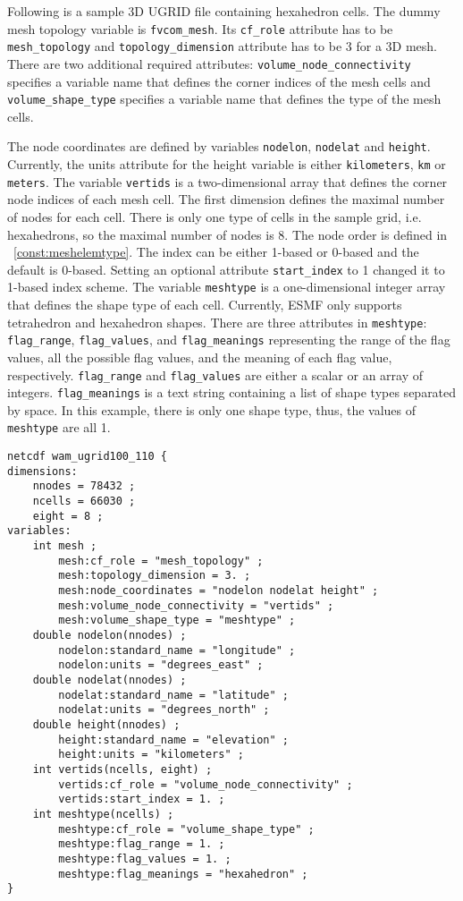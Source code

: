 Following is a sample 3D UGRID file containing hexahedron cells. The dummy mesh topology variable is {\tt fvcom\_mesh}. Its {\tt cf\_role} attribute has to be {\tt mesh\_topology}
and {\tt topology\_dimension} attribute has to be 3 for a 3D mesh.  There are two additional required attributes:
{\tt volume\_node\_connectivity} specifies a variable name that defines the corner indices of the mesh cells and
{\tt volume\_shape\_type} specifies a variable name that defines the type of the mesh cells.

The node coordinates are defined by variables {\tt nodelon}, {\tt nodelat} and {\tt height}. Currently, the units
attribute for the height variable is either {\tt kilometers}, {\tt km} or {\tt meters}.
The variable {\tt vertids} is a two-dimensional array that defines the corner node indices of each mesh cell. The first dimension
defines the maximal number of nodes for each cell. There is only one type of cells in the sample grid, i.e. hexahedrons, so the maximal number
of nodes is 8.  The node order is defined in ~\ref{const:meshelemtype}.  The index can be either 1-based or 0-based and
the default is 0-based.
 Setting an optional attribute {\tt start\_index} to 1 changed it to 1-based index scheme.
The variable {\tt meshtype} is a one-dimensional integer array that defines the shape type of each cell.  Currently, ESMF only
supports tetrahedron and hexahedron shapes. There are three attributes in {\tt meshtype}: {\tt flag\_range}, {\tt flag\_values}, and {\tt flag\_meanings} representing the range of the flag values, all the possible flag values, and the meaning of each flag value, respectively.  {\tt flag\_range} and {\tt flag\_values} are either a scalar or an array of integers.  {\tt flag\_meanings} is a text string containing a list of shape types separated by space. In this example, there
is only one shape type, thus, the values of {\tt meshtype} are all 1.

\begin{verbatim}
netcdf wam_ugrid100_110 {
dimensions:
	nnodes = 78432 ;
	ncells = 66030 ;
	eight = 8 ;
variables:
	int mesh ;
		mesh:cf_role = "mesh_topology" ;
		mesh:topology_dimension = 3. ;
		mesh:node_coordinates = "nodelon nodelat height" ;
		mesh:volume_node_connectivity = "vertids" ;
		mesh:volume_shape_type = "meshtype" ;
	double nodelon(nnodes) ;
		nodelon:standard_name = "longitude" ;
		nodelon:units = "degrees_east" ;
	double nodelat(nnodes) ;
		nodelat:standard_name = "latitude" ;
		nodelat:units = "degrees_north" ;
	double height(nnodes) ;
		height:standard_name = "elevation" ;
		height:units = "kilometers" ;
	int vertids(ncells, eight) ;
		vertids:cf_role = "volume_node_connectivity" ;
		vertids:start_index = 1. ;
	int meshtype(ncells) ;
		meshtype:cf_role = "volume_shape_type" ;
		meshtype:flag_range = 1. ;
		meshtype:flag_values = 1. ;
		meshtype:flag_meanings = "hexahedron" ;
}
\end{verbatim}

